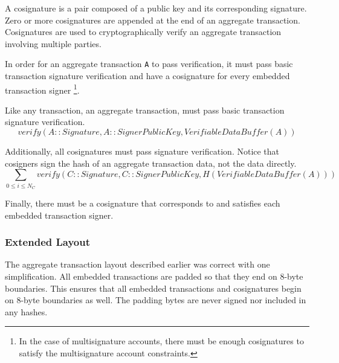 A cosignature is a pair composed of a public key and its corresponding signature.
Zero or more cosignatures are appended at the end of an aggregate transaction.
Cosignatures are used to cryptographically verify an aggregate transaction involving multiple parties.

\begin{figure}[H]
\end{figure}

In order for an aggregate transaction \texttt{A} to pass verification, it must pass basic transaction signature verification and have a cosignature for every embedded transaction signer
\footnote{In the case of multisignature accounts, there must be enough cosignatures to satisfy the multisignature account constraints.}.

Like any transaction, an aggregate transaction, must pass basic transaction signature verification.
$$verify(A::Signature, A::SignerPublicKey, VerifiableDataBuffer(A))$$

Additionally, all cosignatures must pass signature verification.
Notice that cosigners sign the hash of an aggregate transaction data, not the data directly.
$$\sum_{0\leq i \leq N_C} verify(C::Signature, C::SignerPublicKey, H(VerifiableDataBuffer(A)))$$

Finally, there must be a cosignature that corresponds to and satisfies each embedded transaction signer.

\subsubsection{Extended Layout}

The aggregate transaction layout described earlier was correct with one simplification.
All embedded transactions are padded so that they end on 8-byte boundaries.
This ensures that all embedded transactions and cosignatures begin on 8-byte boundaries as well.
The padding bytes are never signed nor included in any hashes.

